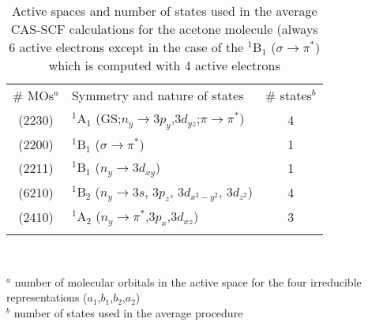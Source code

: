 \documentclass[global,referee]{svjour}
\begin{document}
\begin{table}[h]
\caption{Active spaces and number of states used in the average CAS-SCF calculations
for the acetone molecule (always 6 active electrons except in the case of the 
$^1$B$_1$ ($\sigma\rightarrow\pi^*$) which is computed with 4 active electrons}
\label{Tabaceact}       
\begin{tabular}{clc}
\hline\noalign{\smallskip}
\# MOs$^a$ & Symmetry and nature of states    & \# states$^b$ \\
\noalign{\smallskip}\hline\noalign{\smallskip}
    (2230)   & $^1$A$_1$ (GS;$n_y\!\rightarrow\! 3p_y$,$3d_{yz}$;$\pi\!\rightarrow\!\pi^*$) & 4 \\
    (2200)   & $^1$B$_1$ ($\sigma\!\rightarrow\!\pi^*$) & 1\\
    (2211)   & $^1$B$_1$ ($n_y\!\rightarrow\! 3d_{xy}$) & 1 \\
    (6210)   & $^1$B$_2$ ($n_y\!\rightarrow\! 3s$, $3p_z$, $3d_{x^2\!-\!y^2}$, $3d_{z^2}$) & 4 \\
    (2410)   & $^1$A$_2$ ($n_y\!\rightarrow\!\pi^*$,$3p_x$,$3d_{xz}$) & 3 \\
\noalign{\smallskip}\hline
\end{tabular}\\
{\smallskip}

$^a$ number of molecular orbitals in the active space for 
the four irreducible representations ($a_1$,$b_1$,$b_2$,$a_2$)\\
$^b$ number of states used in the average procedure
\end{table}
\end{document}
